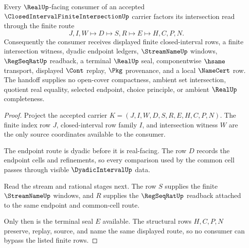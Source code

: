 \begin{theorem}
\label{thm:closed-interval-finite-intersection-real-handoff}
Every $\RealUp$-facing consumer of an accepted $\ClosedIntervalFiniteIntersectionUp$ carrier factors its intersection read through the finite route
$$
J,I,W \longmapsto D \longmapsto S,R \longmapsto E \longmapsto H,C,P,N .
$$
Consequently the consumer receives displayed finite closed-interval rows, a finite intersection witness, dyadic endpoint ledgers, $\StreamNameUp$ windows, $\RegSeqRatUp$ readback, a terminal $\RealUp$ seal, componentwise $\hsame$ transport, displayed $\Cont$ replay, $\Pkg$ provenance, and a local $\NameCert$ row. The handoff supplies no open-cover compactness, ambient set intersection, quotient real equality, selected endpoint, choice principle, or ambient $\RealUp$ completeness.
\end{theorem}
\begin{proof}
Project the accepted carrier $K=(J,I,W,D,S,R,E,H,C,P,N)$. The finite index row $J$, closed-interval row family $I$, and intersection witness $W$ are the only source coordinates available to the consumer.

The endpoint route is dyadic before it is real-facing. The row $D$ records the endpoint cells and refinements, so every comparison used by the common cell passes through visible $\DyadicIntervalUp$ data.

Read the stream and rational stages next. The row $S$ supplies the finite $\StreamNameUp$ windows, and $R$ supplies the $\RegSeqRatUp$ readback attached to the same endpoint and common-cell route.

Only then is the terminal seal $E$ available. The structural rows $H,C,P,N$ preserve, replay, source, and name the same displayed route, so no consumer can bypass the listed finite rows.
\end{proof}




